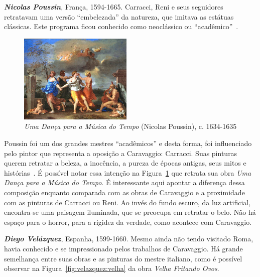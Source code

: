 \textbf{\emph{Nicolas Poussin}}, França, 1594-1665. Carracci, Reni e
seus seguidores retratavam uma versão ``embelezada'' da natureza, que
imitava as estátuas clássicas. Este programa ficou conhecido como
neoclássico ou ``acadêmico''~\cite{gombrich}.

\begin{figure}
  \begin{center}
    \includegraphics[width=0.48\textwidth]{figs/poussin_danca.png}
  \end{center}
  \caption{\emph{Uma Dança para a Música do Tempo} (Nicolas Poussin), c. 1634-1635}
  \label{fig:poussin:danca}
\end{figure}

Poussin foi um dos grandes mestres ``acadêmicos'' e desta forma, foi
influenciado pelo pintor que representa a oposição a Caravaggio:
Carracci. Suas pinturas querem retratar a beleza, a inocência, a
pureza de épocas antigas, seus mitos e histórias~\cite{unglaub}. É
possível notar essa intenção na Figura~\ref{fig:poussin:danca} que
retrata sua obra \textit{Uma Dança para a Música do Tempo}. É
interessante aqui apontar a diferença dessa composição enquanto
comparada com as obras de Caravaggio e a proximidade com as pinturas
de Carracci ou Reni. Ao invés do fundo escuro, da luz artificial,
encontra-se uma paisagem iluminada, que se preocupa em retratar o
belo. Não há espaço para o horror, para a rigidez da verdade, como
acontece com Caravaggio.


\textbf{\emph{Diego Velázquez}}, Espanha, 1599-1660. Mesmo ainda não tendo
visitado Roma, havia conhecido e se impressionado pelos trabalhos de
Caravaggio. Há grande semelhança entre suas obras e as pinturas do mestre
italiano, como é possível observar na Figura~\ref{fig:velazquez:velha} da obra
\textit{Velha Fritando Ovos}. 

